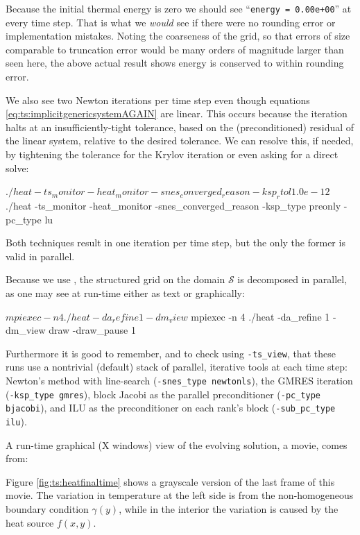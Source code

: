 Because the initial thermal energy is zero we should see ``\texttt{energy = 0.00e+00}'' at every time step.  That is what we \emph{would} see if there were no rounding error or implementation mistakes.  Noting the coarseness of the grid, so that errors of size comparable to truncation error would be many orders of magnitude larger than seen here, the above actual result shows energy is conserved to within rounding error.

We also see two Newton iterations per time step even though equations \eqref{eq:ts:implicitgenericsystemAGAIN} are linear.  This occurs because the \pKSP iteration halts at an insufficiently-tight tolerance, based on the (preconditioned) residual of the linear system, relative to the desired \pSNES tolerance.  We can resolve this, if needed, by tightening the tolerance for the Krylov iteration or even asking for a direct solve:
\begin{cline}
$ ./heat -ts_monitor -heat_monitor -snes_converged_reason -ksp_rtol 1.0e-12
$ ./heat -ts_monitor -heat_monitor -snes_converged_reason -ksp_type preonly -pc_type lu
\end{cline}
Both techniques result in one \pSNES iteration per time step, but the only the former is valid in parallel.

Because we use \pDMDA, the structured grid on the domain $\mathcal{S}$ is decomposed in parallel, as one may see at run-time either as text or graphically:
\begin{cline}
$ mpiexec -n 4 ./heat -da_refine 1 -dm_view
$ mpiexec -n 4 ./heat -da_refine 1 -dm_view draw -draw_pause 1
\end{cline}
Furthermore it is good to remember, and to check using \texttt{-ts\_view}, that these runs use a nontrivial (default) stack of parallel, iterative tools at each time step: Newton's method with line-search (\texttt{-snes\_type newtonls}), the GMRES iteration (\texttt{-ksp\_type gmres}), block Jacobi as the parallel preconditioner (\texttt{-pc\_type bjacobi}), and ILU as the preconditioner on each rank's block (\texttt{-sub\_pc\_type ilu}).

A run-time graphical (X windows) view of the evolving solution, a movie, comes from:
Figure \ref{fig:ts:heatfinaltime} shows a grayscale version of the last frame of this movie.  The variation in temperature at the left side is from the non-homogeneous boundary condition $\gamma(y)$, while in the interior the variation is caused by the heat source $f(x,y)$.
  
